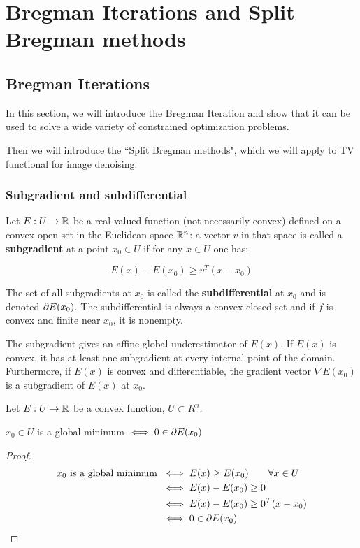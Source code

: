 \chapter{Bregman Iterations and Split Bregman methods}

\section{Bregman Iterations}

In this section, we will introduce the Bregman Iteration and show that it can be used to solve a wide variety of constrained optimization problems.

Then we will introduce the ``Split Bregman methods", which we will apply to TV functional for image denoising.

\subsection{Subgradient and subdifferential}

\begin{defi}
Let $E: U \to \mathbb{R}$ be a real-valued function (not necessarily convex) defined on a convex open set in the Euclidean space $\mathbb{R}^n$: a vector $v$ in that space is called a \textbf{subgradient} \citep{rockafellar} at a point $x_0 \in U$ if for any $x \in U$ one has:

$$E(x) - E(x_0) \geq v^T(x-x_0)$$

\end{defi}

The set of all subgradients at $x_0$ is called the \textbf{subdifferential} at $x_0$ and is denoted $\partial E(x_0)$. The subdifferential is always a convex closed set and if $f$ is convex and finite near $x_0$, it is nonempty.

The subgradient gives an affine global underestimator of $E(x)$. If $E(x)$ is convex, it has at least one subgradient at every internal point of the domain. Furthermore, if $E(x)$ is convex and differentiable, the gradient vector $\nabla E(x_0)$ is a subgradient of $E(x)$ at $x_0$.

\begin{theorem}
Let $E: U \to \mathbb{R}$ be a convex function, $U \subset R^n$.

$x_0 \in U $ is a global minimum $ \iff 0 \in \partial E(x_0)$
\end{theorem}
\begin{proof}

\begin{align*}
x_0 \mbox{ is a global minimum } &\iff E(x) \geq E(x_0) \qquad \forall x \in U \\
&\iff E(x)-E(x_0) \geq 0 \\
&\iff E(x)-E(x_0) \geq 0^T (x-x_0) \\
&\iff 0 \in \partial E(x_0)
\end{align*}
\end{proof}

